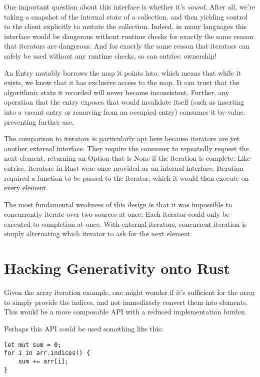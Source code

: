One important question about this interface is whether it's \emph{sound}. After all,
we're taking a snapshot of the internal state of a collection, and then yielding
control to the client explicitly to mutate the collection. Indeed, in many languages
this interface would be dangerous without runtime checks for exactly the same
reason that iterators are dangerous. And for exactly the same reason that iterators
can safely be used without any runtime checks, so can entries: ownership!

An Entry mutably borrows the map it points into, which means that while it
exists, we know that it has exclusive access to the map. It can trust that the
algorithmic state it recorded will never become inconsistent. Further, any operation
that the entry exposes that would invalidate itself (such as inserting into
a vacant entry or removing from an occupied entry) consumes it by-value,
preventing further use.

The comparison to iterators is particularly apt here because iterators
are yet another external interface. They require the consumer to repeatedly
request the next element, returning an Option that is None if the iteration
is complete. Like entries, iterators in Rust were once provided as an internal
interface. Iteration required a function to be passed to the iterator, which
it would then execute on every element.

The most fundamental weakness of this design is that it was impossible to
concurrently iterate over two sources at once. Each iterator could only
be executed to completion at once. With external iterators, concurrent iteration
is simply alternating which iterator to ask for the next element.




\section{Hacking Generativity onto Rust}

Given the array iteration example, one might wonder if it's sufficient for the
array to simply provide the indices, and not immediately convert them into elements.
This would be a more composable API with a reduced implementation burden.

Perhaps this API could be used something like this:

\begin{verbatim}
let mut sum = 0;
for i in arr.indices() {
    sum += arr[i];
}
\end{verbatim}

